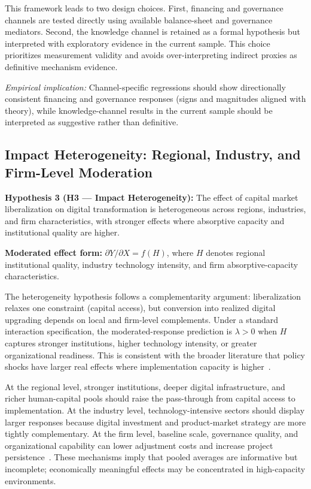 This framework leads to two design choices. First, financing and governance channels are tested directly using available balance-sheet and governance mediators. Second, the knowledge channel is retained as a formal hypothesis but interpreted with exploratory evidence in the current sample. This choice prioritizes measurement validity and avoids over-interpreting indirect proxies as definitive mechanism evidence.

\emph{Empirical implication:} Channel-specific regressions should show directionally consistent financing and governance responses (signs and magnitudes aligned with theory), while knowledge-channel results in the current sample should be interpreted as suggestive rather than definitive.

\subsection{Impact Heterogeneity: Regional, Industry, and Firm-Level Moderation}

\textbf{Hypothesis 3 (H3 --- Impact Heterogeneity):} The effect of capital market liberalization on digital transformation is heterogeneous across regions, industries, and firm characteristics, with stronger effects where absorptive capacity and institutional quality are higher.

\textbf{Moderated effect form:} $\partial Y / \partial X = f(H)$, where $H$ denotes regional institutional quality, industry technology intensity, and firm absorptive-capacity characteristics.

The heterogeneity hypothesis follows a complementarity argument: liberalization relaxes one constraint (capital access), but conversion into realized digital upgrading depends on local and firm-level complements. Under a standard interaction specification, the moderated-response prediction is $\lambda > 0$ when $H$ captures stronger institutions, higher technology intensity, or greater organizational readiness. This is consistent with the broader literature that policy shocks have larger real effects where implementation capacity is higher~\cite{Stiglitz2000,Zhang2024,Du2024}.

At the regional level, stronger institutions, deeper digital infrastructure, and richer human-capital pools should raise the pass-through from capital access to implementation. At the industry level, technology-intensive sectors should display larger responses because digital investment and product-market strategy are more tightly complementary. At the firm level, baseline scale, governance quality, and organizational capability can lower adjustment costs and increase project persistence~\cite{Gao2024,Jin2023}. These mechanisms imply that pooled averages are informative but incomplete; economically meaningful effects may be concentrated in high-capacity environments.

